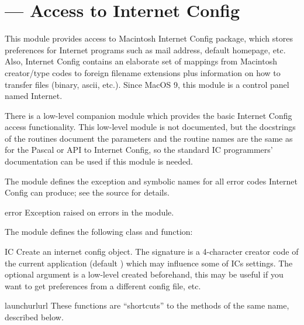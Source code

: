 \section{ ---
         Access to Internet Config}



This module provides access to Macintosh Internet
Config package,
which stores preferences for Internet programs such as mail address,
default homepage, etc. Also, Internet Config contains an elaborate set
of mappings from Macintosh creator/type codes to foreign filename
extensions plus information on how to transfer files (binary, ascii,
etc.). Since MacOS 9, this module is a control panel named Internet.

There is a low-level companion module
 which provides the basic
Internet Config access functionality.  This low-level module is not
documented, but the docstrings of the routines document the parameters
and the routine names are the same as for the Pascal or \C{} API to
Internet Config, so the standard IC programmers' documentation can be
used if this module is needed.

The  module defines the  exception and
symbolic names for all error codes Internet Config can produce; see
the source for details.

\begin{excdesc}{error}
Exception raised on errors in the  module.
\end{excdesc}


The  module defines the following class and function:

\begin{classdesc}{IC}{}
Create an internet config object. The signature is a 4-character creator
code of the current application (default ) which may
influence some of ICs settings. The optional  argument is a
low-level  created beforehand, this may be
useful if you want to get preferences from a different config file,
etc.
\end{classdesc}

\begin{funcdesc}{launchurl}{url}
These functions are ``shortcuts'' to the methods of the same name,
described below.
\end{funcdesc}


